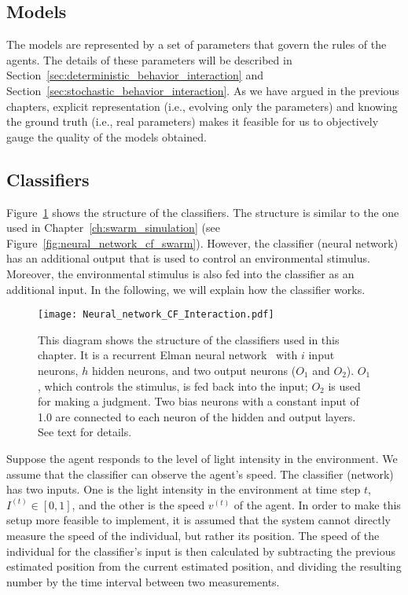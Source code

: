 \subsection{Models}\label{sec:model_deterministic_interaction} 

The models are represented by a set of parameters that govern the rules of the agents. The details of these parameters will be described in Section~\ref{sec:deterministic_behavior_interaction} and Section~\ref{sec:stochastic_behavior_interaction}. As we have argued in the previous chapters, explicit representation (i.e., evolving only the parameters) and knowing the ground truth (i.e., real parameters) makes it feasible for us to objectively gauge the quality of the models obtained. 

\subsection{Classifiers}

Figure~\ref{fig:neural_network_interaction} shows the structure of the classifiers. The structure is similar to the one used in Chapter~\ref{ch:swarm_simulation} (see Figure~\ref{fig:neural_network_cf_swarm}). However, the classifier (neural network) has an additional output that is used to control an environmental stimulus. Moreover, the environmental stimulus is also fed into the classifier as an additional input. In the following, we will explain how the classifier works.

\begin{figure}[!t]
    \centering
    \texttt{[image: Neural\_network\_CF\_Interaction.pdf]}
    \caption{This diagram shows the structure of the classifiers used in this chapter. It is a recurrent Elman neural network~\cite{Elman1990} with $i$ input neurons, $h$ hidden neurons, and two output neurons ($O_1$ and $O_2$). $O_1$, which controls the stimulus, is fed back into the input; $O_2$ is used for making a judgment. Two bias neurons with a constant input of 1.0 are connected to each neuron of the hidden and output layers. See text for details.}
    \label{fig:neural_network_interaction}
\end{figure}

Suppose the agent responds to the level of light intensity in the environment. We assume that the classifier can observe the agent's speed. The classifier (network) has two inputs. One is the light intensity in the environment at time step $t$, $I^{\left(t\right)}\in [0,1]$, and the other is the speed $v^{\left(t\right)}$ of the agent. In order to make this setup more feasible to implement, it is assumed that the system cannot directly measure the speed of the individual, but rather its position. The speed of the individual for the classifier's input is then calculated by subtracting the previous estimated position from the current estimated position, and dividing the resulting number by the time interval between two measurements.

